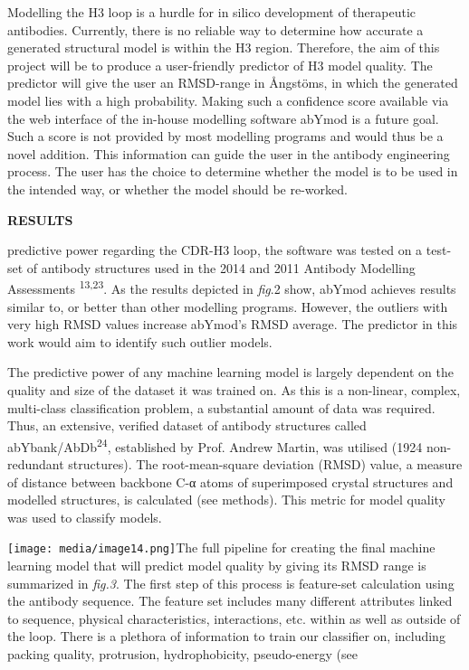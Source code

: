 \documentclass[
]{article}
\begin{document}
Modelling the H3 loop is a hurdle for in silico development of
therapeutic antibodies. Currently, there is no reliable way to determine
how accurate a generated structural model is within the H3 region.
Therefore, the aim of this project will be to produce a user-friendly
predictor of H3 model quality. The predictor will give the user an
RMSD-range in Ångstöms, in which the generated model lies with a high
probability. Making such a confidence score available via the web
interface of the in-house modelling software abYmod is a future goal.
Such a score is not provided by most modelling programs and would thus
be a novel addition. This information can guide the user in the antibody
engineering process. The user has the choice to determine whether the
model is to be used in the intended way, or whether the model should be
re-worked.

\textbf{RESULTS}

predictive power regarding the CDR-H3 loop, the software was tested on a
test-set of antibody structures used in the 2014 and 2011 Antibody
Modelling Assessments \textsuperscript{13,23}. As the results depicted
in \emph{fig}.2 show, abYmod achieves results similar to, or better than
other modelling programs. However, the outliers with very high RMSD
values increase abYmod's RMSD average. The predictor in this work would
aim to identify such outlier models.

The predictive power of any machine learning model is largely dependent
on the quality and size of the dataset it was trained on. As this is a
non-linear, complex, multi-class classification problem, a substantial
amount of data was required. Thus, an extensive, verified dataset of
antibody structures called abYbank/AbDb\textsuperscript{24}, established
by Prof. Andrew Martin, was utilised (1924 non-redundant structures).
The root-mean-square deviation (RMSD) value, a measure of distance
between backbone C-α atoms of superimposed crystal structures and
modelled structures, is calculated (see methods). This metric for model
quality was used to classify models.

\texttt{[image: media/image14.png]}The
full pipeline for creating the final machine learning model that will
predict model quality by giving its RMSD range is summarized in
\emph{fig.3}. The first step of this process is feature-set calculation
using the antibody sequence. The feature set includes many different
attributes linked to sequence, physical characteristics, interactions,
etc. within as well as outside of the loop. There is a plethora of
information to train our classifier on, including packing quality,
protrusion, hydrophobicity, pseudo-energy (see
\end{document}
